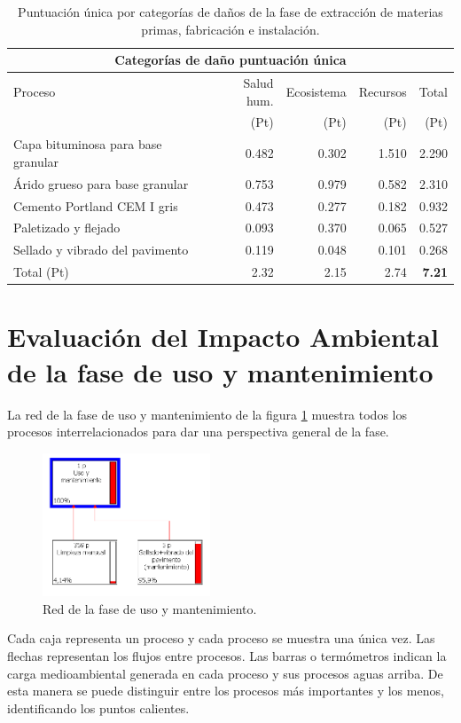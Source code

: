 \begin{table}[!htb]
\centering
\begin{tabular}{p{6cm}rrrr}
\toprule
\multicolumn{5}{c}{Categorías de daño puntuación única}\\
\midrule
Proceso & Salud hum. & Ecosistema & Recursos & Total\\
 & (Pt) & (Pt) &  (Pt) & (Pt)\\
\midrule
Capa bituminosa para base granular & 0.482 & 0.302 & 1.510 & 2.290\\
Árido grueso para base granular & 0.753 & 0.979 & 0.582 & 2.310\\
Cemento Portland CEM I gris & 0.473 & 0.277 & 0.182 & 0.932\\
Paletizado y flejado & 0.093 & 0.370 & 0.065 & 0.527\\
Sellado y vibrado del pavimento & 0.119 & 0.048 & 0.101 & 0.268\\
\midrule
Total (Pt) & 2.32 & 2.15 & 2.74 & \textbf{7.21}\\
\bottomrule
\end{tabular}
\caption{Puntuación única por categorías de daños de la fase de extracción de materias primas, fabricación e instalación.}
\label{categoriasdanosfabricacion}
\end{table}

\section{Evaluación del Impacto Ambiental de la fase de uso y mantenimiento}

La red de la fase de uso y mantenimiento de la figura \ref{fig:uso_red} muestra todos los procesos interrelacionados para dar una perspectiva general de la fase.

\begin{figure}[!htb]
\centering
\includegraphics[width=5cm]{img/uso_red.png}
\caption{Red de la fase de uso y mantenimiento.}
\label{fig:uso_red}
\end{figure}

Cada caja representa un proceso y cada proceso se muestra una única vez. Las flechas representan los flujos entre procesos. Las barras o termómetros indican la carga medioambiental generada en cada proceso y sus procesos aguas arriba. De esta manera se puede distinguir entre los procesos más importantes y los menos, identificando los puntos calientes.

